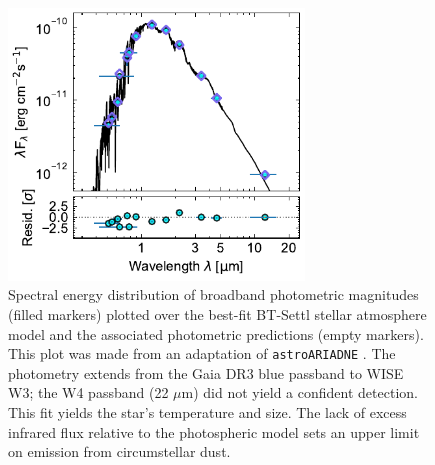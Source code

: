 \documentclass{nature3}
\begin{document}
\begin{methods}
\begin{figure}[!t]
  \centering
  \includegraphics[width=0.7\textwidth]{figures/sf4.pdf}
  \caption{
    Spectral energy distribution of broadband photometric magnitudes
    (filled markers)
    plotted over the best-fit BT-Settl stellar atmosphere model
    \cite{Allard2012} and the associated photometric predictions
    (empty markers).  This plot was made from an adaptation of
    \texttt{astroARIADNE} \cite{Vines2022}.  The photometry extends
    from the Gaia DR3 blue passband to WISE W3;  the W4 passband (22
    $\mu$m) did not yield a confident detection.  This fit yields the
    star's temperature and size.  The lack of excess infrared flux
    relative to the photospheric model sets an upper limit on emission
    from circumstellar dust.
    }
  \label{fig:sed}
\end{figure}


\end{methods}
\end{document}
